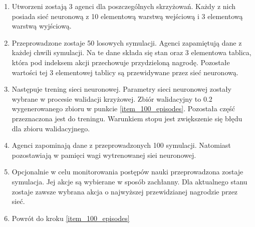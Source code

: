 \documentclass[12pt]{book}
\theoremstyle{plain}
\begin{document}
	\begin{enumerate}
		\item 
		Utworzeni zostają 3 agenci dla poszczególnych skrzyżowań. Każdy z nich posiada sieć
		neuronową z 10 elementową warstwą wejściową i 3 elementową warstwą wyjściową.
		\item Przeprowadzone zostaje 50 losowych symulacji. Agenci zapamiętują dane z każdej chwili symulacji. Na te dane składa się stan oraz 3 elementowa tablica, która pod indeksem akcji przechowuje przydzieloną nagrodę. Pozostałe wartości tej 3 elementowej tablicy są przewidywane przez sieć neuronową. \label{item_100_episodes}
		\item Następuje trening sieci neuronowej. Parametry sieci neuronowej zostały wybrane w procesie walidacji krzyżowej. Zbiór walidacyjny to 0.2 wygenerowanego zbioru w punkcie \ref{item_100_episodes}. Pozostała część przeznaczona jest do treningu. Warunkiem stopu jest zwiększenie się błędu dla zbioru walidacyjnego.
		\item Agenci zapominają dane z przeprowadzonych 100 symulacji. Natomiast pozostawiają w pamięci wagi wytrenowanej siei neuronowej.
		\item Opcjonalnie w celu monitorowania postępów nauki przeprowadzona zostaje symulacja. Jej akcje są wybierane w sposób zachłanny. Dla aktualnego stanu zostaje zawsze wybrana akcja o najwyższej przewidzianej nagrodzie przez sieć.
		\item Powrót do kroku \ref{item_100_episodes}
	\end{enumerate}
	
\end{document}

